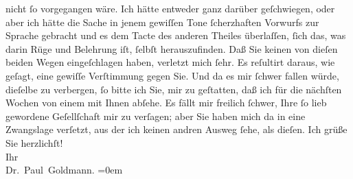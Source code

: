                nicht ſo vorgegangen wäre. Ich hätte entweder ganz darüber geſchwiegen, oder aber ich
               hätte die Sache in jenem gewiſſen Tone ſcherzhaften Vorwurfs zur Sprache gebracht und
               es dem Tacte des anderen Theiles überlaſſen, ſich das, was darin Rüge und Belehrung
               iſt, ſelbſt herauszufinden.\pend
           \pstart
           Daß Sie  keinen von dieſen beiden Wegen
               eingeſchlagen haben, verletzt mich ſehr. Es reſultirt daraus, wie geſagt, eine
               gewiſſe Verſtimmung gegen Sie. Und da es mir ſchwer fallen würde, dieſelbe zu
               verbergen, ſo bitte ich Sie, \strikeout{\textcolor{gray}{d}} mir zu geſtatten, daß ich für die nächſten Wochen von einem {\pb}\label{K_L02646-3v}\label{K_L02646-3h} mit Ihnen abſehe. Es fällt
               mir freilich ſchwer, Ihre ſo lieb gewordene Geſellſchaft mir zu verſagen; aber Sie
               haben mich da in eine Zwangslage verſetzt, aus der ich keinen andren Ausweg ſehe, als
               dieſen.\pend
           \pstart
           Ich grüße Sie herzlichſt! {\\[\baselineskip]}Ihr {\\[\baselineskip]}\spacefill\mbox{Dr. Paul Goldmann.}\pend
           \leftskip=0em{}\endnumbering{}  
      
